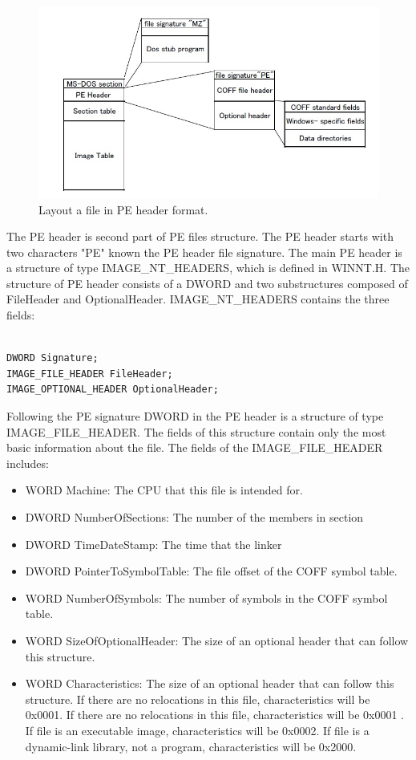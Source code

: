\begin{figure}[httb]
\centering
\includegraphics[width=1\textwidth]{graph/peheader1.jpg}
\caption{Layout a file in PE header format.}
\label{fig:peheader}
\end{figure}
The PE header is second part of PE files structure. The PE header starts with two characters "PE" known the PE header file signature. The main PE header is a structure of type IMAGE\_NT\_HEADERS, which is defined in WINNT.H. The structure of PE header consists of a DWORD and two substructures composed of FileHeader and OptionalHeader. IMAGE\_NT\_HEADERS contains the three fields:
\begin{verbatim}

DWORD Signature;
IMAGE_FILE_HEADER FileHeader;
IMAGE_OPTIONAL_HEADER OptionalHeader;
\end{verbatim}
Following the PE signature DWORD in the PE header is a structure of type IMAGE\_FILE\_HEADER. The fields of this structure contain only the most basic information about the file. The fields of the IMAGE\_FILE\_HEADER includes:
\begin{itemize}
\item WORD Machine: The CPU that this file is intended for.
\item DWORD NumberOfSections: The number of the members in section
\item DWORD TimeDateStamp: The time that the linker
\item DWORD PointerToSymbolTable: The file offset of the COFF symbol table. 
\item WORD NumberOfSymbols: The number of symbols in the COFF symbol table.
\item WORD SizeOfOptionalHeader: The size of an optional header that can follow this structure.
\item WORD Characteristics: The size of an optional header that can follow this structure. If there are no relocations in this file, characteristics will be 0x0001. If there are no relocations in this file, characteristics will be 0x0001 . If file is an executable image, characteristics will be 0x0002.  If file is a dynamic-link library, not a program, characteristics will be 0x2000.
\end{itemize}



